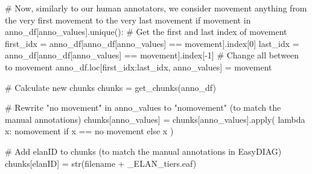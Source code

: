 \documentclass[
  letterpaper,
  DIV=11,
  numbers=noendperiod]{scrreprt}
\newenvironment{Shaded}{\begin{snugshade}}{\end{snugshade}}
\newcommand{\BuiltInTok}[1]{\textcolor[rgb]{0.00,0.23,0.31}{#1}}
\newcommand{\CommentTok}[1]{\textcolor[rgb]{0.37,0.37,0.37}{#1}}
\newcommand{\ControlFlowTok}[1]{\textcolor[rgb]{0.00,0.23,0.31}{#1}}
\newcommand{\DecValTok}[1]{\textcolor[rgb]{0.68,0.00,0.00}{#1}}
\newcommand{\KeywordTok}[1]{\textcolor[rgb]{0.00,0.23,0.31}{#1}}
\newcommand{\NormalTok}[1]{\textcolor[rgb]{0.00,0.23,0.31}{#1}}
\newcommand{\OperatorTok}[1]{\textcolor[rgb]{0.37,0.37,0.37}{#1}}
\newcommand{\StringTok}[1]{\textcolor[rgb]{0.13,0.47,0.30}{#1}}
\begin{document}
\begin{Shaded}
\begin{Highlighting}[]
        
        \CommentTok{\# Now, similarly to our human annotators, we consider movement anything from the very first movement to the very last movement}
        \ControlFlowTok{if} \StringTok{\textquotesingle{}movement\textquotesingle{}} \KeywordTok{in}\NormalTok{ anno\_df[}\StringTok{\textquotesingle{}anno\_values\textquotesingle{}}\NormalTok{].unique():}
            \CommentTok{\# Get the first and last index of movement}
\NormalTok{            first\_idx }\OperatorTok{=}\NormalTok{ anno\_df[anno\_df[}\StringTok{\textquotesingle{}anno\_values\textquotesingle{}}\NormalTok{] }\OperatorTok{==} \StringTok{\textquotesingle{}movement\textquotesingle{}}\NormalTok{].index[}\DecValTok{0}\NormalTok{]}
\NormalTok{            last\_idx }\OperatorTok{=}\NormalTok{ anno\_df[anno\_df[}\StringTok{\textquotesingle{}anno\_values\textquotesingle{}}\NormalTok{] }\OperatorTok{==} \StringTok{\textquotesingle{}movement\textquotesingle{}}\NormalTok{].index[}\OperatorTok{{-}}\DecValTok{1}\NormalTok{]}
            \CommentTok{\# Change all between to movement}
\NormalTok{            anno\_df.loc[first\_idx:last\_idx, }\StringTok{\textquotesingle{}anno\_values\textquotesingle{}}\NormalTok{] }\OperatorTok{=} \StringTok{\textquotesingle{}movement\textquotesingle{}}

        \CommentTok{\# Calculate new chunks}
\NormalTok{        chunks }\OperatorTok{=}\NormalTok{ get\_chunks(anno\_df)}

        \CommentTok{\# Rewrite "no movement" in anno\_values to "nomovement" (to match the manual annotations)}
\NormalTok{        chunks[}\StringTok{\textquotesingle{}anno\_values\textquotesingle{}}\NormalTok{] }\OperatorTok{=}\NormalTok{ chunks[}\StringTok{\textquotesingle{}anno\_values\textquotesingle{}}\NormalTok{].}\BuiltInTok{apply}\NormalTok{(}
            \KeywordTok{lambda}\NormalTok{ x: }\StringTok{\textquotesingle{}nomovement\textquotesingle{}} \ControlFlowTok{if}\NormalTok{ x }\OperatorTok{==} \StringTok{\textquotesingle{}no movement\textquotesingle{}} \ControlFlowTok{else}\NormalTok{ x}
\NormalTok{        )}

        \CommentTok{\# Add elanID to chunks (to match the manual annotations in EasyDIAG)}
\NormalTok{        chunks[}\StringTok{\textquotesingle{}elanID\textquotesingle{}}\NormalTok{]  }\OperatorTok{=} \BuiltInTok{str}\NormalTok{(filename }\OperatorTok{+} \StringTok{\textquotesingle{}\_ELAN\_tiers.eaf\textquotesingle{}}\NormalTok{)}


\end{Highlighting}
\end{Shaded}
\end{document}
